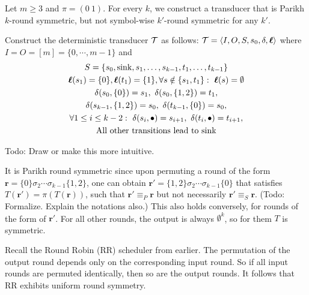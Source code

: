 \begin{example}
Let $m\geq 3$ and $\pi=(0\ 1)$. For every $k$, we construct a transducer that is Parikh $k$-round symmetric, but not symbol-wise $k'$-round symmetric for any $k'$.

Construct the deterministic transducer $\mathcal{T}$ as follows: $\mathcal{T}=\left< I,O,S,s_0,\delta,\boldsymbol{\ell}\right>$ where $I=O=[m]=\{0,\cdots, m-1\}$ and
\begin{gather*}
    S = \{ s_0, \mathrm{sink}, 
        s_1, \dots, s_{k-1}, 
        t_1, \dots, t_{k-1} \} \\
    \lab(s_1)=\{0\}, \lab(t_1)=\{1\},
        \forall s\notin\{s_1, t_1\}:\  \lab(s)=\emptyset \\
    \delta(s_0, \{0\}) = s_1,\ 
        \delta(s_0, \{1,2\}) = t_1, \\
    \delta(s_{k-1}, \{1,2\}) = s_0,\ 
        \delta(t_{k-1}, \{0\}) = s_0, \\
    \forall 1\leq i \leq k-2:\ 
        \delta(s_i, \bullet)= s_{i+1},\ 
        \delta(t_i, \bullet)= t_{i+1}, \\
    \text{All other transitions lead to $\mathrm{sink}$}
\end{gather*}

Todo: Draw or make this more intuitive.

It is Parikh round symmetric since upon permuting a round of the form $\mathbf{r}=\{0\}\sigma_2\cdots\sigma_{k-1}\{1,2\}$, one can obtain $\mathbf{r}'=\{1,2\}\sigma_2\cdots\sigma_{k-1}\{0\}$ that satisfies $T(\mathbf{r}')=\pi(T(\mathbf{r}))$, such that $\mathbf{r}'\equiv_P \mathbf{r}$ but not necessarily $\mathbf{r}'\equiv_S \mathbf{r}$. (Todo: Formalize. Explain the notations also.) This also holds conversely, for rounds of the form of $\mathbf{r}'$. For all other rounds, the output is always $\emptyset^k$, so for them $T$ is symmetric.
\end{example}

\begin{example}[Round Robin]
Recall the Round Robin (RR) scheduler from earlier. The permutation of the output round depends only on the corresponding input round. So if all input rounds are permuted identically, then so are the output rounds. It follows that RR exhibits uniform round symmetry.
\end{example}



